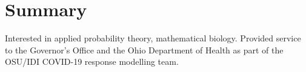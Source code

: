 \documentclass[11pt,a4paper,sans]{moderncv}        %
\begin{document}
\makecvtitle







\section{Summary}
Interested in applied probability theory, mathematical biology. Provided service to the Governor's Office and the Ohio Department of Health as part of the OSU/IDI COVID-19 response modelling team. \\
\end{document}
